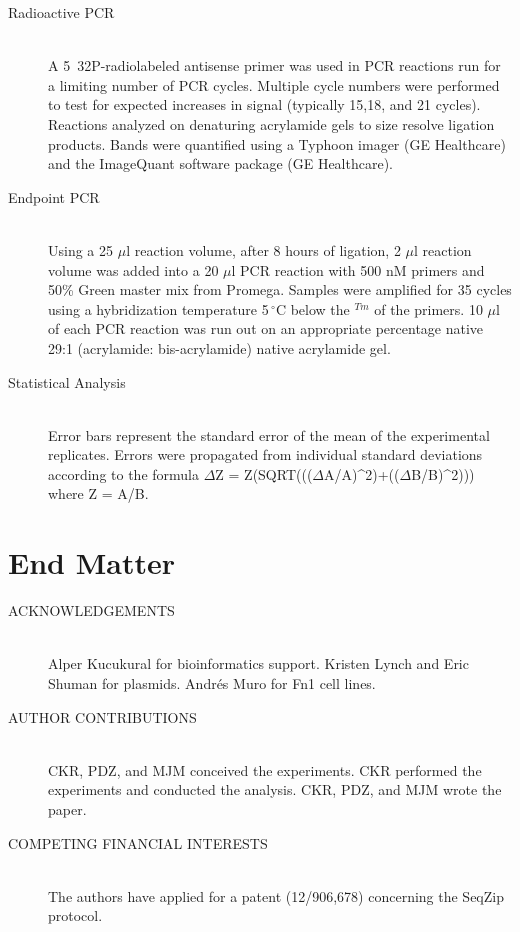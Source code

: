 \begin{description}
		\item[Radioactive PCR] \hfill \\
		A 5\textprime~32P-radiolabeled antisense primer was used in PCR reactions run for a limiting number of PCR cycles. Multiple cycle numbers were performed to test for expected increases in signal (typically 15,18, and 21 cycles). Reactions analyzed on denaturing acrylamide gels to size resolve ligation products. Bands were quantified using a Typhoon imager (GE Healthcare) and the ImageQuant software package (GE Healthcare).

		\item[Endpoint PCR] \hfill \\
		Using a 25 $\mu$l reaction volume, after 8 hours of ligation, 2 $\mu$l reaction volume was added into a 20 $\mu$l PCR reaction with 500 nM primers and 50\% Green master mix from Promega. Samples were amplified for 35 cycles using a hybridization temperature 5$\,^{\circ}\mathrm{C}$ below the $^{Tm}$ of the primers. 10 $\mu$l of each PCR reaction was run out on an appropriate percentage native 29:1 (acrylamide: bis-acrylamide) native acrylamide gel.

		\item[Statistical Analysis] \hfill \\
		Error bars represent the standard error of the mean of the experimental replicates. Errors were propagated from individual standard deviations according to the formula $\Delta$Z = Z(SQRT((($\Delta$A/A)^2)+(($\Delta$B/B)^2))) where Z = A/B.

		\end{description}

\section{End Matter}
	\label{SeqZipPaper:sec:End Matter}

	\begin{description}

		\item[ACKNOWLEDGEMENTS] \hfill \\
		Alper Kucukural for bioinformatics support. Kristen Lynch and Eric Shuman for plasmids. Andrés Muro for Fn1 cell lines. 

		\item[AUTHOR CONTRIBUTIONS] \hfill \\
		CKR, PDZ, and MJM conceived the experiments. CKR performed the experiments and conducted the analysis. CKR, PDZ, and MJM wrote the paper. 

		\item[COMPETING FINANCIAL INTERESTS] \hfill \\
		The authors have applied for a patent (12/906,678) concerning the SeqZip protocol. 

		\end{description}

